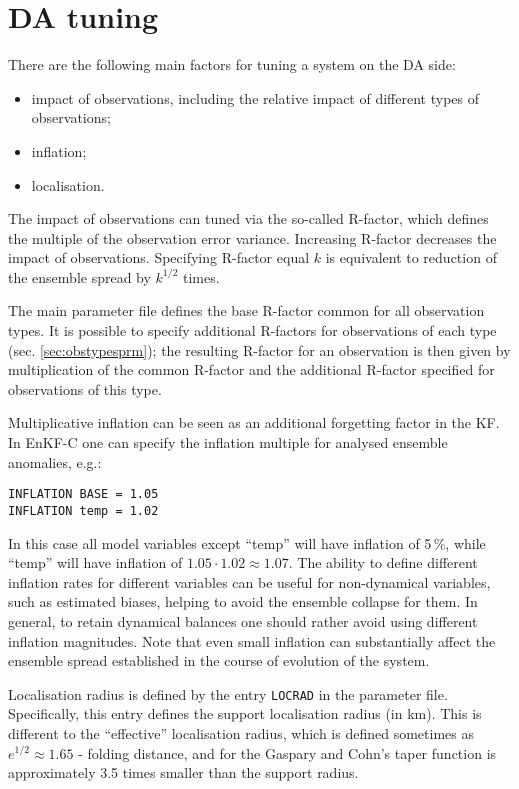 \documentclass[11pt]{report}
\begin{document}
\section{DA tuning}
\label{sec:datuning}

There are the following main factors for tuning a system on the DA side:
\begin{itemize}
\item impact of observations, including the relative impact of different types of observations;
\item inflation;
\item localisation.
\end{itemize}

The impact of observations can tuned via the so-called R-factor, which defines the multiple of the observation error variance.
Increasing R-factor decreases the impact of observations.
Specifying R-factor equal $k$ is equivalent to reduction of the ensemble spread by $k^{1/2}$ times.

The main parameter file defines the base R-factor common for all observation types.
It is possible to specify additional R-factors for observations of each type (sec. \ref{sec:obstypesprm}); the resulting R-factor for an observation is then given by multiplication of the common R-factor and the additional R-factor specified for observations of this type.

Multiplicative inflation can be seen as an additional forgetting factor in the KF.
In EnKF-C one can specify the inflation multiple for analysed ensemble anomalies, e.g.:
\begin{Verbatim}[frame=single,fontsize=\footnotesize]
INFLATION BASE = 1.05
INFLATION temp = 1.02
\end{Verbatim}
In this case all model variables except ``temp'' will have inflation of 5\,\%, while ``temp'' will have inflation of $1.05 \cdot 1.02 \approx 1.07$.
The ability to define different inflation rates for different variables can be useful for non-dynamical variables, such as estimated biases, helping to avoid the ensemble collapse for them.
In general, to retain dynamical balances one should rather avoid using different inflation magnitudes.
Note that even small inflation can substantially affect the ensemble spread established in the course of evolution of the system.

Localisation radius is defined by the entry \verb|LOCRAD| in the parameter file.
Specifically, this entry defines the support localisation radius (in km).
This is different to the ``effective'' localisation radius, which is defined sometimes as $e^{1/2}\approx 1.65$ - folding distance, and for the Gaspary and Cohn's taper function is approximately 3.5 times smaller than the support radius.
\end{document}
